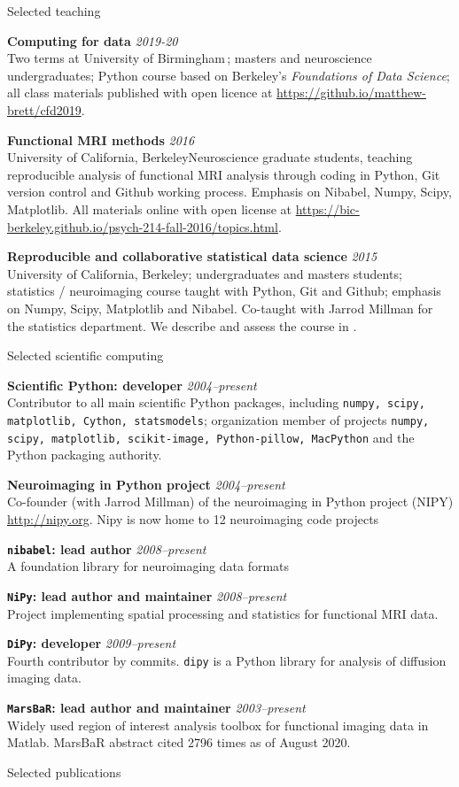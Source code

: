 \documentclass[11pt]{cv}
\newcommand{\PlaceDateNote}[3]{{\bf #1} \hfill {\em #2} \\#3}
\newcommand{\UCB}{University of California, Berkeley}
\newcommand{\UoB}{University of Birmingham\,}
\newcommand{\Pkg}[1]{{\tt #1}}
\begin{document}
\begin{cvSection}{Selected teaching}

\PlaceDateNote{Computing for data}{2019-20}
    {Two terms at \UoB; masters and neuroscience undergraduates; Python course
    based on Berkeley's {\it Foundations of Data Science}; all class materials
    published with open licence at
    \url{https://github.io/matthew-brett/cfd2019}.}

\PlaceDateNote{Functional MRI methods}{2016}
    {\UCB Neuroscience graduate students, teaching reproducible analysis of
    functional MRI analysis through coding in Python, Git version control and
    Github working process. Emphasis on Nibabel, Numpy, Scipy, Matplotlib. All
    materials online with open license at
    \url{https://bic-berkeley.github.io/psych-214-fall-2016/topics.html}.}

\PlaceDateNote{Reproducible and collaborative statistical data science}{2015}
    {\UCB; undergraduates and masters students; statistics / neuroimaging
    course taught with Python, Git and Github; emphasis on Numpy, Scipy,
    Matplotlib and Nibabel. Co-taught with Jarrod Millman for the statistics
    department.  We describe and assess the course in
    \cite{millman2018rcsds}.}

\end{cvSection}

\begin{cvSection}{Selected scientific computing}

\PlaceDateNote{Scientific Python: developer}{2004--present}
{Contributor to all main scientific Python packages, including
    \Pkg{numpy, scipy, matplotlib, Cython, statsmodels}; organization member
    of projects \Pkg{numpy, scipy, matplotlib, scikit-image, Python-pillow,
MacPython} and the Python packaging authority.}

\PlaceDateNote{Neuroimaging in Python project}{2004--present}
{Co-founder (with Jarrod Millman) of the neuroimaging in Python project (NIPY)
    \url{http://nipy.org}.  Nipy is now home to 12 neuroimaging
    code projects}

\PlaceDateNote{\Pkg{nibabel}: lead author}{2008--present}
    {A foundation library for neuroimaging data formats}

\PlaceDateNote{\Pkg{NiPy}: lead author and maintainer}{2008--present} {Project
    implementing spatial processing and statistics for functional MRI
    data.}

\PlaceDateNote{\Pkg{DiPy}: developer}{2009--present}
    {Fourth contributor by commits.  \Pkg{dipy} is a Python library for
    analysis of diffusion imaging data}.

\PlaceDateNote{\Pkg{MarsBaR}: lead author and maintainer}{2003--present}
    {Widely used region of interest analysis toolbox for functional imaging
    data in Matlab.  MarsBaR abstract cited 2796 times as of August 2020.}

\end{cvSection}

\begin{cvSection}{Selected publications}

\nocite{virtanen2020scipy,
    millman2018rcsds,
    garyfallidis2014dipy,
    Poline2012,
    Poldrack2008,
    Millman2007,
    Brett2007,
    Saxe2006,
    Nichols2005,
    Brett2002}

\printbibliography[heading=none]

\end{cvSection}
\end{document}
